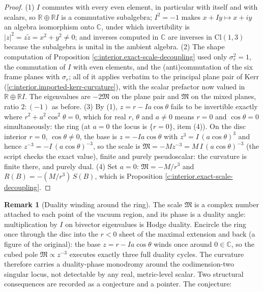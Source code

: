 \documentclass[11pt]{article}
\theoremstyle{definition}
\newtheorem{remark}[theorem]{Remark}
\theoremstyle{plain}
\providecommand{\C}{}\renewcommand{\C}{\mathbb{C}}
\providecommand{\Cl}{}\renewcommand{\Cl}{\mathrm{Cl}}
\providecommand{\R}{}\renewcommand{\R}{\mathbb{R}}
\begin{document}
\begin{proof}
(1) $I$ commutes with every even element, in particular with itself and with scalars, so $\R \oplus \R I$ is a commutative subalgebra; $I^2 = -1$ makes $x + Iy \mapsto x + iy$ an algebra isomorphism onto $\C$, under which invertibility is $|z|^2 = z\tilde z = x^2 + y^2 \neq 0$; and inverses computed in $\C$ are inverses in $\Cl(1,3)$ because the subalgebra is unital in the ambient algebra. (2) The shape computation of Proposition \ref{c:interior.exact-scale-decoupling} used only $\sigma_r^2 = 1$, the commutation of $I$ with even elements, and the (anti)commutation of the six frame planes with $\sigma_r$; all of it applies verbatim to the principal plane pair of Kerr (\ref{c:interior.imported-kerr-curvature}), with the scalar prefactor now valued in $\R \oplus \R I$. The eigenvalues are $-2\mathfrak M$ on the plane pair and $\mathfrak M$ on the mixed planes, ratio $2 : (-1)$ as before. (3) By (1), $z = r - Ia\cos\theta$ fails to be invertible exactly where $r^2 + a^2\cos^2\theta = 0$, which for real $r$, $\theta$ and $a \neq 0$ means $r = 0$ and $\cos\theta = 0$ simultaneously: the ring (at $a = 0$ the locus is $\{r = 0\}$, item (4)). On the disc interior $r = 0$, $\cos\theta \neq 0$, the base is $z = -Ia\cos\theta$ with $z^3 = I\,(a\cos\theta)^3$ and hence $z^{-3} = -I\,(a\cos\theta)^{-3}$, so the scale is $\mathfrak M = -M z^{-3} = M\,I\,(a\cos\theta)^{-3}$ (the script checks the exact value), finite and purely pseudoscalar: the curvature is finite there, and purely dual. (4) Set $a = 0$: $\mathfrak M = -M/r^3$ and $R(B) = -(M/r^3)\,S(B)$, which is Proposition \ref{c:interior.exact-scale-decoupling}.

\end{proof}

\begin{remark}[Duality winding around the ring]\label{c:note.interior.duality-winding-around-ring}
The scale $\mathfrak M$ is a complex number attached to each point of the vacuum region, and its phase is a duality angle: multiplication by $I$ on bivector eigenvalues is Hodge duality. Encircle the ring once through the disc into the $r < 0$ sheet of the maximal extension and back (a figure of the original): the base $z = r - Ia\cos\theta$ winds once around $0 \in \C$, so the cubed pole $\mathfrak M \propto z^{-3}$ executes exactly three full duality cycles. The curvature therefore carries a duality-phase monodromy around the codimension-two singular locus, not detectable by any real, metric-level scalar. Two structural consequences are recorded as a conjecture and a pointer. The conjecture:
\end{remark}
\end{document}
